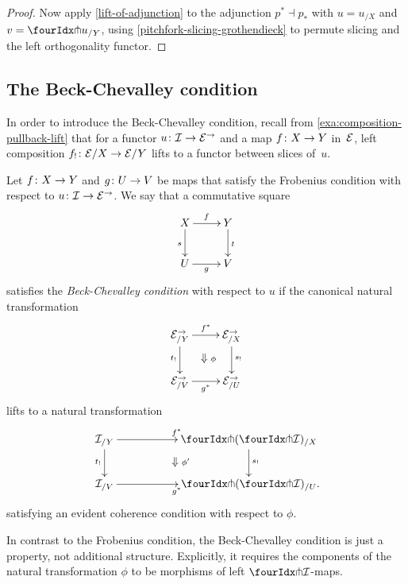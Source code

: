 \documentclass[reqno,10pt,a4paper,oneside,draft]{amsart}
\begin{document}
\begin{proof}
Now apply \cref{lift-of-adjunction} to the adjunction $p^* \dashv p_*$ with $u = u_{/X}$ and $v = {\liftr{u}}_{/Y}$, using \cref{pitchfork-slicing-grothendieck} to permute slicing and the left orthogonality functor.
\end{proof}

\subsection*{The Beck-Chevalley condition}

In order to introduce the Beck-Chevalley condition, recall from \cref{exa:composition-pullback-lift} that for a functor $u \colon \mathcal{I} \to \mathcal{E}^\to$ and a map $f \colon X \to Y$ in~$\mathcal{E}$, left composition $f_! \colon \mathcal{E}/X \to \mathcal{E}/Y$ lifts to a functor between slices of~$u$.

\begin{definition} \label{def:beck-chevalley}
Let $f \colon X \to Y$ and $g \colon U \to V$ be maps that satisfy the Frobenius condition with respect to $u \colon \mathcal{I} \to \mathcal{E}^\to$.
We say that a commutative square
\[
\xymatrix{
  X
  \ar[r]^{f}
  \ar[d]_{s}
&
  Y
  \ar[d]^{t}
\\
  U
  \ar[r]_{g}
&
  V
}
\]
satisfies the \emph{Beck-Chevalley condition} with respect to $u$ if the canonical natural transformation
\[
\xymatrix{
  \catE^\to_{/Y}
  \ar[d]_{t_!}
  \ar[r]^{f^*}
  \ar@{}[dr]|{\textstyle\Downarrow \rlap{$\labelstyle\phi$}}
&
  \catE^\to_{/X}
  \ar[d]^{s_!}
\\
  \catE^\to_{/V}
  \ar[r]_{g^*}
&
  \catE^\to_{/U}
}
\]
lifts to a natural transformation
\[
\xymatrix@C+3em{
  \cal{I}_{/Y}
  \ar[r]^{f^*}
  \ar[d]_{t_!}
  \ar@{}[dr]|{\textstyle\Downarrow \rlap{$\labelstyle\phi'$}}
&
  \liftl{(\liftr{\cal{I}})}_{/X}
  \ar[d]^{s_!}
\\
  \cal{I}_{/V}
  \ar[r]_{g^*}
&
  \liftl{(\liftr{\cal{I}})}_{/U}
\rlap{.}}
\]
satisfying an evident coherence condition with respect to $\phi$.
\end{definition}

\begin{remark} \label{beck-chevalley-no-coherence}
In contrast to the Frobenius condition, the Beck-Chevalley condition is just a property, not additional structure.
Explicitly, it requires the components of the natural transformation $\phi$ to be morphisms of left $\liftr{\cal{I}}$-maps.
\end{remark}
\end{document}
